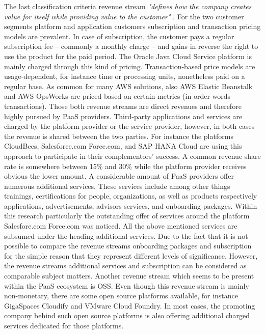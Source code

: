 The last classification criteria revenue stream \textit{"defines how the company creates value for itself while providing value to the customer"} \citep[p. 53]{Johnson2008}. For the two customer segments platform and application customers subscription and transaction pricing models are prevalent. In case of subscription, the customer pays a regular subscription fee -- commonly a monthly charge -- and gains in reverse the right to use the product for the paid period. The Oracle Java Cloud Service platform is mainly charged through this kind of pricing. Transaction-based price models are usage-dependent, for instance time or processing units, nonetheless paid on a regular base. As common for many \ac{AWS} solutions, also \ac{AWS} Elastic Beanstalk and \ac{AWS} OpsWorks are priced based on certain metrics (in order words transactions). Those both revenue streams are direct revenues and therefore highly pursued by \ac{PaaS} providers. Third-party applications and services are charged by the platform provider or the service provider, however, in both cases the revenue is shared between the two parties. For instance the platforms CloudBees, Salesforce.com Force.com, and SAP HANA Cloud are using this approach to participate in their complementors' success. A common revenue share rate is somewhere between 15\% and 30\% while the platform provider receives obvious the lower amount. A considerable amount of \ac{PaaS} providers offer numerous additional services. These services include among other things trainings, certifications for people, organizations, as well as products respectively applications, advertisements, advisors services, and onboarding packages. Within this research particularly the outstanding offer of services around the platform Salesfore.com Force.com was noticed. All the above mentioned services are subsumed under the heading additional services. Due to the fact that it is not possible to compare the revenue streams onboarding packages and subscription for the simple reason that they represent different levels of significance. However, the revenue streams additional services and subscription can be considered as comparable subject matters. Another revenue stream which seems to be present within the \ac{PaaS} ecosystem is \ac{OSS}. Even though this revenue stream is mainly non-monetary, there are some open source platforms available, for instance GigaSpaces Cloudify and VMware Cloud Foundry. In most cases, the promoting company behind such open source platforms is also offering additional charged services dedicated for those platforms.


